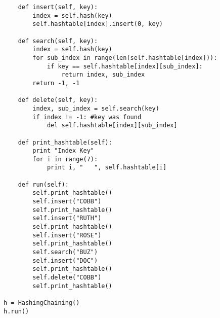 \documentclass[11pt]{article}
\begin{document}
\begin{enumerate}
\begin{verbatim}
    def insert(self, key):
        index = self.hash(key)
        self.hashtable[index].insert(0, key)
        
    def search(self, key):
        index = self.hash(key)
        for sub_index in range(len(self.hashtable[index])):
            if key == self.hashtable[index][sub_index]:
                return index, sub_index
        return -1, -1
        
    def delete(self, key):
        index, sub_index = self.search(key)
        if index != -1: #key was found
            del self.hashtable[index][sub_index]
            
    def print_hashtable(self):
        print "Index Key"
        for i in range(7):
            print i, "   ", self.hashtable[i]
            
    def run(self):
        self.print_hashtable()
        self.insert("COBB")
        self.print_hashtable()
        self.insert("RUTH")
        self.print_hashtable()
        self.insert("ROSE")
        self.print_hashtable()
        self.search("BUZ")
        self.insert("DOC")
        self.print_hashtable()
        self.delete("COBB")
        self.print_hashtable()
        
h = HashingChaining()
h.run()
    \end{verbatim}
    


\end{enumerate}
\end{document}
